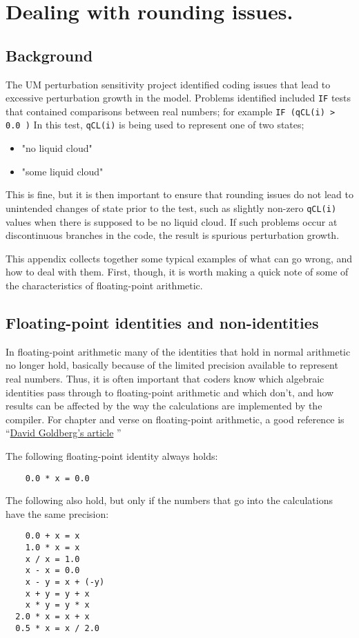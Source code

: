 \section{Dealing with rounding issues.}
\label{app:Rounding}

\subsection{Background}

The UM perturbation sensitivity project 
identified coding issues 
that lead to excessive perturbation growth in the model. 
Problems identified included \verb|IF| tests that 
contained comparisons between real numbers; 
for example \verb|IF (qCL(i) > 0.0 )|
In this test, \verb|qCL(i)| is being used to represent one of two states; 
\begin{itemize}
\item "no liquid cloud"
\item "some liquid cloud"
\end{itemize}

This is fine, but it is then important to ensure that rounding 
issues do not lead to unintended changes of state prior to the test, 
such as slightly non-zero \verb|qCL(i)| values when there is supposed 
to be no liquid cloud. If such problems occur at discontinuous 
branches in the code, the result is spurious perturbation growth.

This appendix collects together some typical examples of what can go wrong, 
and how to deal with them. First, though, it is worth making a 
quick note of some of the characteristics of floating-point arithmetic.

\subsection{Floating-point identities and non-identities}
In floating-point arithmetic many of the identities that hold in normal 
arithmetic no longer hold, basically because of the limited precision 
available to represent real numbers. Thus, it is often important that 
coders know which algebraic identities pass through to floating-point 
arithmetic and which don't, and how results can be affected by the 
way the calculations are implemented by the compiler. 
For chapter and verse on floating-point arithmetic, 
a good reference is  ``\href{http://docs.sun.com/source/806-3568/ncg_goldberg.html}{David Goldberg's article}
''

The following floating-point identity always holds:
\begin{verbatim} 
    0.0 * x = 0.0
\end{verbatim}
The following also hold, but only if the numbers that go into the 
calculations have the same precision:
\begin{verbatim} 
    0.0 + x = x
    1.0 * x = x
    x / x = 1.0
    x - x = 0.0
    x - y = x + (-y)
    x + y = y + x
    x * y = y * x
  2.0 * x = x + x
  0.5 * x = x / 2.0
\end{verbatim}

